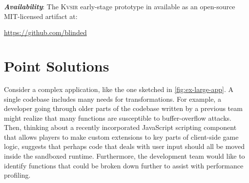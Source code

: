 \documentclass[sigplan,review,anonymous,10pt]{acmart}
\newcommand{\sys}{{\scshape Kv{\textalpha}sir}\xspace}
\newcommand{\heading}[1]{\vspace{2pt}\noindent\textbf{\emph{#1}}:\enspace}
\begin{document}

\heading{Availability}
The \sys early-stage prototype in available as an open-source MIT-licensed artifact at:
\begin{center}
  \url{https://github.com/blinded}
\end{center}



\section{Point Solutions}
\label{sec:problem}

Consider a complex application, like the one
sketched in \cref{fig:ex-large-app}.
A single codebase includes many needs for transformations.
For example, a developer going through older parts of the codebase written by 
a previous team might realize that many functions are susceptible to buffer-overflow attacks.
Then, thinking about a recently incorporated JavaScript scripting component 
that allows players to make custom extensions to key parts of client-side game logic, 
suggests that perhaps code that deals with user input should all be moved inside 
the sandboxed runtime.
Furthermore, the development team would like to identify functions that could 
be broken down further to assist with performance profiling.
\end{document}
